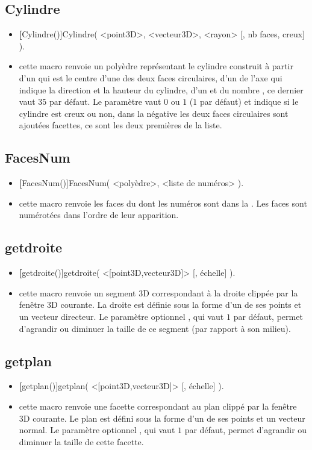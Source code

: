 \subsection{Cylindre}
\begin{itemize}
 \item \util \textbf[Cylindre()]{Cylindre( <point3D>, <vecteur3D>, <rayon> [, nb faces, creux] )}.
 \item \desc cette macro renvoie un polyèdre représentant le cylindre construit à partir d'un  qui est le centre d'une des deux faces circulaires, d'un  de l'axe qui indique la direction et la hauteur du cylindre, d'un  et du nombre , ce dernier vaut $35$ par défaut. Le paramètre  vaut $0$ ou $1$ ($1$ par défaut) et indique si le cylindre est creux ou non, dans la négative les deux faces circulaires sont ajoutées facettes, ce sont les deux premières de la liste. 
\end{itemize}


\subsection{FacesNum}
\begin{itemize}
 \item \util \textbf[FacesNum()]{FacesNum( <polyèdre>, <liste de numéros> )}.
 \item \desc cette macro renvoie les faces du  dont les numéros sont dans la . Les faces sont numérotées dans l'ordre de leur apparition.
\end{itemize}


\subsection{getdroite}
\begin{itemize}
 \item \util \textbf[getdroite()]{getdroite( <[point3D,vecteur3D]> [, échelle] )}.
 \item \desc cette macro renvoie un segment 3D correspondant à la droite  clippée par la fenêtre 3D courante. La droite est définie sous la forme d'un de ses points et un vecteur directeur. Le paramètre optionnel , qui vaut $1$ par défaut, permet d'agrandir ou diminuer la taille de ce segment (par rapport à son milieu).
\end{itemize}


\subsection{getplan}
\begin{itemize}
 \item \util \textbf[getplan()]{getplan( <[point3D,vecteur3D]> [, échelle] )}.
 \item \desc cette macro renvoie une facette correspondant au plan  clippé par la fenêtre 3D courante. Le plan est défini sous la forme d'un de ses points et un vecteur normal. Le paramètre optionnel , qui vaut $1$ par défaut, permet d'agrandir ou diminuer la taille de cette facette.
\end{itemize}



